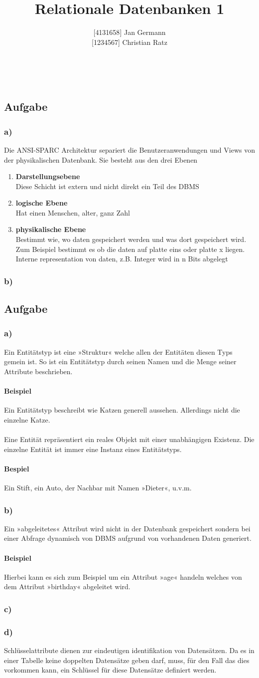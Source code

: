 \documentclass[11pt,a4paper,DIV=9]{scrartcl}
\author{{[}4131658{]} Jan Germann \\{[}1234567{]} Christian Ratz}
\title{Relationale Datenbanken 1}
\newcounter{temp}
\newcommand{\aufgabe}[1]{
  \setcounter{temp}{\value{subsection}}
  \setcounter{subsection}{#1}
  \addtocounter{subsection}{-1}
  \subsection{Aufgabe}
  \setcounter{subsection}{\value{temp}}
}
\newcommand{\teil}[2][]{
  \subsubsection*{#2) #1}
}
\renewcommand{\author}[1]{\renewcommand{\author}{#1}}
\renewcommand{\title}[1]{\renewcommand{\title}{#1}}
\newcommand{\makehomeworktitle}{
  \begin{minipage}{6.5cm}
    \sf{\author}
  \end{minipage}
  \begin{minipage}{6.5cm}
    \begin{flushright}
      \sf{\title\\\today}
    \end{flushright}
  \end{minipage}
  \\[0.2cm]
  \begin{center}
    \sf{
      \color{blue}{
        \LARGE{Aufgabenblatt \blattnr}
      }
    }
  \end{center}
  \vspace{0.1cm}
}
\begin{document}
\makehomeworktitle

\aufgabe{1}
\teil{a}
  Die ANSI-SPARC Architektur separiert die Benutzeranwendungen und Views von der physikalischen Datenbank. Sie besteht aus den drei Ebenen 
  \begin{enumerate}
    \item \textbf{Darstellungsebene} \\
      Diese Schicht ist extern und nicht direkt ein Teil des DBMS
    \item \textbf{logische Ebene} \\
      Hat einen Menschen,  alter, ganz Zahl 
    \item \textbf{physikalische Ebene} \\
      Bestimmt wie, wo daten gespeichert werden und was dort gespeichert wird. Zum Beispiel bestimmt es ob die daten auf platte eins oder platte x liegen. Interne representation von daten, z.B. Integer wird in n Bits abgelegt
    \end{enumerate}
\teil{b}

\aufgabe{2}
\teil{a}
  Ein Entitätstyp ist eine »Struktur« welche allen der Entitäten diesen Typs gemein ist. So ist ein Entitätstyp durch seinen Namen und die Menge seiner Attribute beschrieben.
  \paragraph{Beispiel} Ein Entitätstyp beschreibt  wie Katzen generell aussehen. Allerdings nicht die einzelne Katze.
  \paragraph{} Eine Entität repräsentiert ein reales Objekt mit einer unabhängigen Existenz. Die einzelne Entität ist immer eine Instanz eines Entitätstyps.
  \paragraph{Bespiel} Ein Stift, ein Auto, der Nachbar mit Namen »Dieter«, u.v.m.
\teil{b}
  Ein »abgeleitetes« Attribut wird nicht in der Datenbank gespeichert sondern bei einer Abfrage dynamisch von DBMS aufgrund von vorhandenen Daten generiert.
  \paragraph{Beispiel} Hierbei kann es sich zum Beispiel um ein Attribut »age« handeln welches von dem Attribut »birthday« abgeleitet wird.
\teil{c}
\teil{d}
  Schlüsselattribute dienen zur eindeutigen identifikation von Datensätzen. Da es in einer Tabelle keine doppelten Datensätze geben darf, muss, für den Fall das dies vorkommen kann, ein Schlüssel für diese Datensätze definiert werden.
\end{document}
